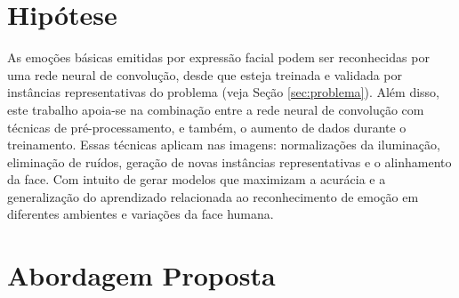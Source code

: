 \section{Hipótese}
As emoções básicas emitidas por expressão facial podem ser reconhecidas por uma rede neural de convolução, desde que esteja treinada e validada por instâncias representativas do problema (veja Seção \ref{sec:problema}). Além disso, este trabalho apoia-se na combinação entre a rede neural de convolução com técnicas de pré-processamento, e também, o aumento de dados durante o treinamento. Essas técnicas aplicam nas imagens: normalizações da iluminação, eliminação de ruídos, geração de novas instâncias representativas e o alinhamento da face. Com intuito de gerar modelos que maximizam a acurácia e a generalização do aprendizado relacionada ao reconhecimento de emoção em diferentes ambientes e variações da face humana.  


\section{Abordagem Proposta}\label{sec:abordagemproposta}

